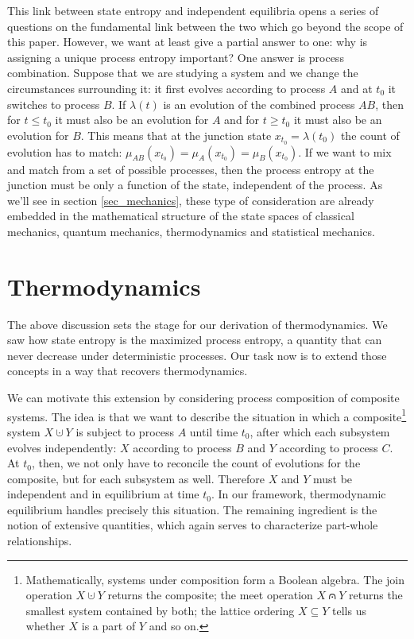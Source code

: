 \documentclass[letterpaper,twocolumn]{article}
\begin{document}
This link between state entropy and independent equilibria opens a series of questions on the fundamental link between the two which go beyond the scope of this paper. However, we want at least give a partial answer to one: why is assigning a unique process entropy important? One answer is process combination. Suppose that we are studying a system and we change the circumstances surrounding it: it first evolves according to process $A$ and at $t_0$ it switches to process $B$. If $\lambda(t)$ is an evolution of the combined process $AB$, then for $t \leq t_0$ it must also be an evolution for $A$ and for $t \geq t_0$ it must also be an evolution for $B$. This means that at the junction state $x_{t_0} = \lambda(t_0)$ the count of evolution has to match: $\mu_{AB}(x_{t_0})=\mu_A(x_{t_0})=\mu_B(x_{t_0})$. If we want to mix and match from a set of possible processes, then the process entropy at the junction must be only a function of the state, independent of the process. As we'll see in section \ref{sec_mechanics}, these type of consideration are already embedded in the mathematical structure of the state spaces of classical mechanics, quantum mechanics, thermodynamics and statistical mechanics.

\section{Thermodynamics}\label{sec_thermodynamics}

The above discussion sets the stage for our derivation of thermodynamics. We saw how state entropy is the maximized process entropy, a quantity that can never decrease under deterministic processes. Our task now is to extend those concepts in a way that recovers thermodynamics.

We can motivate this extension by considering process composition of composite systems. The idea is that we want to describe the situation in which a composite\footnote{Mathematically, systems under composition form a Boolean algebra. The join operation $X \cupdot Y$ returns the composite; the meet operation $X \capdot Y$ returns the smallest system contained by both; the lattice ordering $X \subseteq Y$ tells us whether $X$ is a part of $Y$ and so on.} system $X \cupdot Y$ is subject to process $A$ until time $t_0$, after which each subsystem evolves independently: $X$ according to process $B$ and $Y$ according to process $C$. At $t_0$, then, we not only have to reconcile the count of evolutions for the composite, but for each subsystem as well. Therefore $X$ and $Y$ must be independent and in equilibrium at time $t_0$. In our framework, thermodynamic equilibrium handles precisely this situation. The remaining ingredient is the notion of extensive quantities, which again serves to characterize part-whole relationships.
\end{document}
